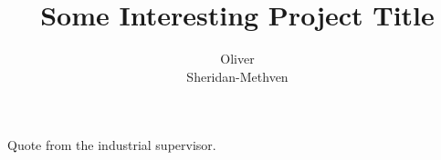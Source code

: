 \documentclass[a4paper, 10pt, english, oneside]{extarticle}
\author{Oliver\\Sheridan-Methven}
\title{Some Interesting Project Title}
\begin{document}
\maketitle 

\blindmathpaper

\begin{myquote}
	Quote from the industrial supervisor.
\end{myquote}
\end{document}
